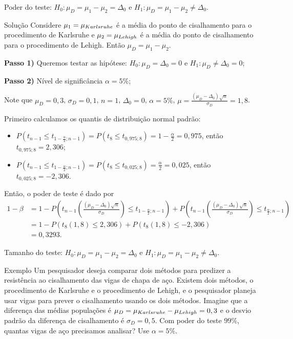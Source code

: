 \documentclass[9pt]{beamer}
\begin{document}
\begin{frame}{Poder do teste: $H_0:\mu_D = \mu_1 - \mu_2 = \Delta_0$ e $H_1:\mu_D =  \mu_1 - \mu_2 \neq \Delta_0$.}

\footnotesize
\begin{block}{Solução}
	Considere $\mu_1=\mu_{\tiny Karlsruhe}$ é a média do ponto de cisalhamento para o procedimento de Karlsruhe e $\mu_2 = \mu_{\tiny Lehigh}$ é a média do ponto de cisalhamento para o procedimento de Lehigh. Então $\mu_D = \mu_1 - \mu_2$.
	
	\textbf{Passo 1)} Queremos testar as hipótese: $H_0: \mu_D = \Delta_0 = 0$ e $H_1: \mu_D \neq \Delta_0 = 0$;
	
	\textbf{Passo 2)} Nível de significância $\alpha=5\%$;
	
	Note que $\mu_D = 0,3$, $\sigma_D = 0,1$, $n=1$, $\Delta_0=0$, $\alpha=5\%$, $\mu =  \frac{( \mu_D - \Delta_0)\sqrt{n}}{\sigma_D} =1,8 $.
	
	Primeiro calculamos os quantis de distribuição normal padrão:
	\begin{itemize}
		\item $P\left( t_{n-1} \leq t_{1-\frac{\alpha}{2}; n-1} \right) = P\left( t_{8} \leq t_{0,975; 8} \right) = 1-\frac{\alpha}{2} = 0,975$, então $t_{0,975; 8} = 2,306$;
		\item $P\left( t_{n-1} \leq t_{1-\frac{\alpha}{2}; n-1} \right) = P\left( t_{8} \leq t_{0,025; 8} \right) = \frac{\alpha}{2} = 0,025$, então $t_{0,025; 8} = -2,306$.
	\end{itemize}

	Então, o poder de teste é dado por
	\begin{align*}
	1-\beta &= 1 - P\left( t_{n-1}\left( \frac{(\mu_D - \Delta_0)\sqrt{n}}{\sigma_D} \right) \leq t_{1-\frac{\alpha}{2};n-1} \right) + P\left( t_{n-1}\left( \frac{(\mu_D - \Delta_0)\sqrt{n}}{\sigma_D} \right) \leq t_{\frac{\alpha}{2};n-1} \right)\\
	&= 1 - P \left( t_8 (1,8) \leq 2,306 \right) + P \left( t_8 (1,8) \leq -2,306 \right)\\
	&=0,3293.
	\end{align*}
\end{block}
\normalsize

\end{frame}

\begin{frame}{Tamanho do teste: $H_0:\mu_D = \mu_1 - \mu_2 = \Delta_0$ e $H_1:\mu_D =  \mu_1 - \mu_2 \neq \Delta_0$.}

\large
\begin{block}{Exemplo}
	Um pesquisador deseja comparar dois métodos para predizer a resistência ao cisalhamento das vigas de chapa de aço. Existem dois métodos, o procedimento de Karlsruhe e o procedimento de Lehigh, e o pesquisador planeja usar vigas para prever o cisalhamento usando os dois métodos. Imagine que a diferença das médias populações é $\mu_D = \mu_{\tiny Karlsruhe} - \mu_{\tiny Lehigh} = 0,3$ e o desvio padrão da diferença de cisalhamento é $\sigma_D = 0,5$. Com poder do teste $99\%$, quantas vigas de aço precisamos analisar? Use $\alpha=5\%$. 
\end{block}	
\normalsize

\end{frame}
\end{document}

